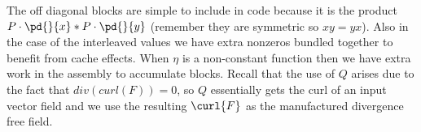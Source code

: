 The off diagonal blocks are simple to include in code because it is the product $P\cdot \pd{}{x} * P \cdot \pd{}{y}$ (remember they are symmetric so $xy = yx$). Also in the case of the interleaved values we have extra nonzeros bundled together to benefit from cache effects. When $\eta$ is a non-constant function then we have extra work in the assembly to accumulate blocks. Recall that the use of $Q$ arises due to the fact that $div(curl(F)) = 0$, so $Q$ essentially gets the curl of an input vector field and we use the resulting $\curl{F}$ as the manufactured divergence free field. 
